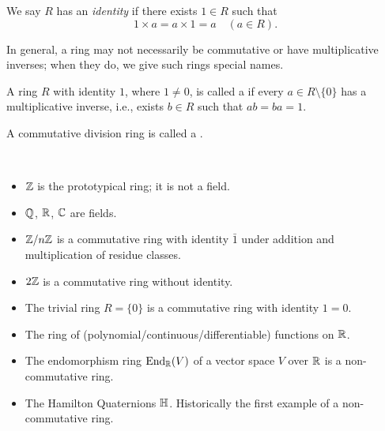 We say $R$ has an \emph{identity} if there exists $1\in R$ such that
\[1\times a=a\times 1=a\quad(a\in R).\]

In general, a ring may not necessarily be commutative or have multiplicative inverses; when they do, we give such rings special names.

\begin{definition}
A ring $R$ with identity $1$, where $1\neq0$, is called a  if every $a\in R\setminus\{0\}$ has a multiplicative inverse, i.e., exists $b\in R$ such that $ab=ba=1$.

A commutative division ring is called a .
\end{definition}

\begin{figure}[H]
\centering
{}
\end{figure}

\begin{example} \
\begin{itemize}
\item $\mathbb Z$ is the prototypical ring; it is not a field.
\item $\mathbb Q$, $\mathbb R$, $\mathbb C$ are fields.
\item $\mathbb Z/n\mathbb Z$ is a commutative ring with identity $\bar{1}$ under addition and multiplication of residue classes.
\item $2\mathbb Z$ is a commutative ring without identity.
\item The trivial ring $R=\{0\}$ is a commutative ring with identity $1=0$.
\item The ring of (polynomial/continuous/differentiable) functions on $\mathbb R$.
\item The endomorphism ring $\operatorname{End}_\mathbb R(V)$ of a vector space $V$ over $\mathbb R$ is a non-commutative ring.
\item The Hamilton Quaternions $\mathbb H$. Historically the first example of a non-commutative ring.
\end{itemize}
\end{example}

